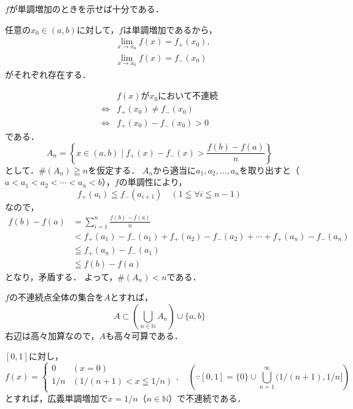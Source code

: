
\begin{tproof} $f$が単調増加のときを示せば十分である．

    任意の$ x_0 \in (a,b)$に対して，$f$は単調増加であるから，
    \begin{align*}
         & \lim_{x \to x_0} f(x)=f_{+} (x_0) , \\
         & \lim_{x \to x_0} f(x)=f_{-} (x_0)
    \end{align*}
    がそれぞれ存在する．

    \begin{align*}
             & \text{$f(x)$が$x_0$において不連続}  \\
        \iff & f_{+} (x_0) \ne f_{-} (x_0) \\
        \iff & f_{+} (x_0) - f_{-} (x_0)>0
    \end{align*}
    である．
    \[
        A_n =  \left \{ x \in (a,b) \mid f_{+} (x) - f_{-} (x) > \frac{f(b)-f(a)}{n} \right \}
    \]
    として．$\# (A_n) \geqq n$を仮定する．
    $A_n$から適当に$a_1,a_2,\ldots,a_n$を取り出すと（$a<a_1 < a_2 < \cdots < a_n<b$），$f$の単調性により，
    \[
        f_{+} (a_i) \leqq f_{-} (a_{i+1}) \quad (1 \leqq \forall i \leqq n-1)
    \]
    なので，
    \begin{align*}
        f(b)-f(a) & = \sum_{i=1}^{n} \frac{f(b)-f(a)}{n}                                                         \\
                  & < f_{+} (a_1) - f_{-} (a_1) + f_{+} (a_2) - f_{-} (a_2) + \cdots + f_{+} (a_n) - f_{-} (a_n) \\
                  & \leqq f_{+} (a_n) - f_{-} (a_1)                                                              \\
                  & \leqq f(b)-f(a)
    \end{align*}
    となり，矛盾する．
    よって，$\# (A_n) < n$である．

    $f$の不連続点全体の集合を$A$とすれば，
    \[
        A \subset \left ( \bigcup_{n \in \mathbb{N}}  A_n \right ) \cup \{ a, b \}
    \]
    右辺は高々加算なので，$A$も高々可算である．
\end{tproof}

\begin{tanswer}
    $ [0,1]$に対し，
    \[
        f(x)= \begin{cases}
            0   & (x=0)                   \\
            1/n & (1/(n+1) < x \leqq 1/n) \\
        \end{cases}
        ,\quad \left ( \because [0,1] = \{ 0 \} \cup \bigcup_{n=1}^{\infty} (1/(n+1),1/n] \right )
    \]
    とすれば，広義単調増加で$x=1/n$（$n \in \mathbb{N}$）で不連続である．
\end{tanswer}


